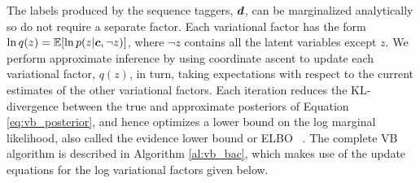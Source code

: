 %
The labels produced by the sequence taggers, $\boldsymbol d$, can be marginalized analytically so do not require
a separate factor.
Each variational factor has the form $\ln q(z) = \mathbb{E}[\ln p(z | \boldsymbol c, \neg z)]$, 
where $\neg z$ contains all the latent variables except $z$.
We perform approximate inference by
using coordinate ascent to update each variational factor, $q(z)$, in turn,
taking expectations with respect to the current estimates of the other variational factors.
Each iteration reduces the KL-divergence between the true and approximate posteriors
of Equation \ref{eq:vb_posterior}, and hence optimizes a lower bound on the 
log marginal likelihood, also called the evidence lower bound or ELBO
~\cite{Bishop2006,attias_advances_2000}.
The complete VB algorithm is described in Algorithm \ref{al:vb_bac},
which makes use of the update equations for the log variational factors given below.
